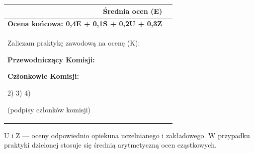 \documentclass[11pt,a4paper]{article}
\newcommand{\fullrow}{\dimexpr\textwidth-2\tabcolsep-2\arrayrulewidth\relax}
\begin{document}
\begin{tabularx}{\textwidth}{|p{0.8cm}|X|p{4.5cm}|}
\multicolumn{2}{|r|}{\textbf{Średnia ocen (E)}} & \centering \arraybackslash \dotfill \\ \hline

\multicolumn{2}{|r|}{\textbf{Ocena końcowa: 0,4E + 0,1S + 0,2U + 0,3Z}} & \centering \arraybackslash \dotfill \\ \hline

\multicolumn{3}{|p{\fullrow}|}{
Zaliczam praktykę zawodową na ocenę (K): \dotfill

\vspace{1em}

\textbf{Przewodniczący Komisji:} \dotfill

\vspace{1em}

\textbf{Członkowie Komisji:}

2) \dotfill \hfill 3) \dotfill \hfill 4) \dotfill

\vspace{0.5em}

\small (podpisy członków komisji)
} \\ \hline

\end{tabularx}

\vspace{1em}

\noindent
\footnotesize{
U i Z — oceny odpowiednio opiekuna uczelnianego i zakładowego. W przypadku praktyki dzielonej stosuje się średnią arytmetyczną ocen cząstkowych.
}
\end{document}
